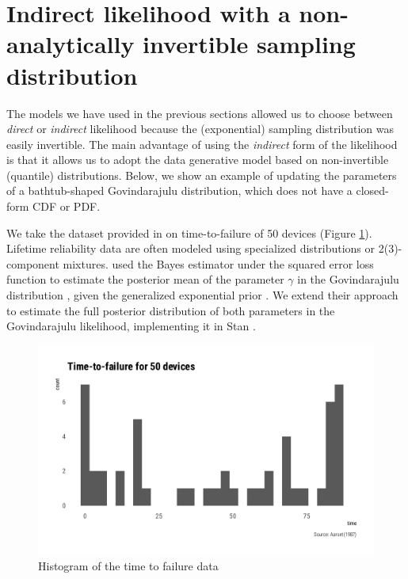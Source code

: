 \documentclass[
  12pt,
]{article}
\begin{document}
\hypertarget{indirect-likelihood-with-a-non-analytically-invertible-sampling-distribution}{%
\section{Indirect likelihood with a non-analytically invertible sampling distribution}\label{indirect-likelihood-with-a-non-analytically-invertible-sampling-distribution}}

The models we have used in the previous sections allowed us to choose between \emph{direct} or \emph{indirect} likelihood because the (exponential) sampling distribution was easily invertible. The main advantage of using the \emph{indirect} form of the likelihood is that it allows us to adopt the data generative model based on non-invertible (quantile) distributions. Below, we show an example of updating the parameters of a bathtub-shaped Govindarajulu distribution, which does not have a closed-form CDF or PDF.

We take the dataset provided in \citet{aarset1987HowIdentifyBathtub} on time-to-failure of 50 devices (Figure \ref{fig:bathtub-hist}). Lifetime reliability data are often modeled using specialized distributions \citep{nadarajah2009BathtubshapedFailureRate} or 2(3)-component mixtures. \citet{nair2020BayesianInferenceQuantile} used the Bayes estimator under the squared error loss function to estimate the posterior mean of the parameter \(\gamma\) in the Govindarajulu distribution \citep{nair2012GovindarajuluDistributionProperties}, given the generalized exponential prior \citep{gupta2007GeneralizedExponentialDistribution}. We extend their approach to estimate the full posterior distribution of both parameters in the Govindarajulu likelihood, implementing it in Stan \citep{standevelopmentteam2021RStanInterfaceStan}.

\begin{figure}

{\centering \includegraphics[width=0.8\linewidth]{ilbm_article_files/figure-latex/bathtub-hist-1} 

}

\caption{Histogram of the time to failure data}\label{fig:bathtub-hist}
\end{figure}
\end{document}
